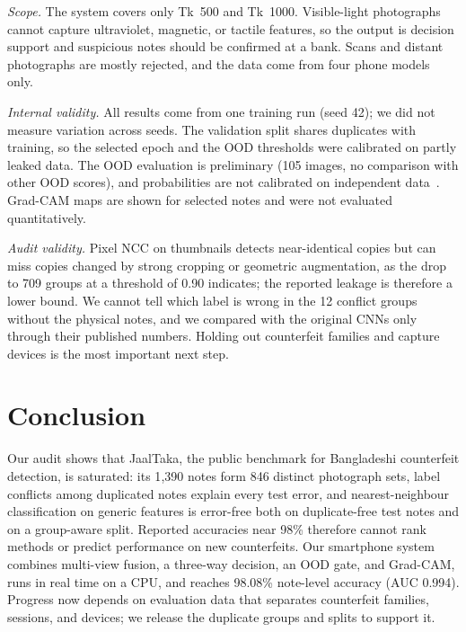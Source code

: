 \documentclass[pdflatex,iicol,sn-mathphys-num]{sn-jnl}
\begin{document}
\emph{Scope.} The system covers only Tk~500 and Tk~1000. Visible-light photographs
cannot capture ultraviolet, magnetic, or tactile features, so the output is decision
support and suspicious notes should be confirmed at a bank. Scans and distant
photographs are mostly rejected, and the data come from four phone models only.

\emph{Internal validity.} All results come from one training run (seed 42); we did not
measure variation across seeds. The validation split shares duplicates with training,
so the selected epoch and the OOD thresholds were calibrated on partly leaked data. The
OOD evaluation is preliminary (105 images, no comparison with other OOD scores), and
probabilities are not calibrated on independent data~\cite{guo2017calibration}.
Grad-CAM maps are shown for selected notes and were not evaluated quantitatively.

\emph{Audit validity.} Pixel NCC on thumbnails detects near-identical copies but can
miss copies changed by strong cropping or geometric augmentation, as the drop to 709
groups at a threshold of 0.90 indicates; the reported leakage is therefore a lower bound.
We cannot tell which label is wrong in the 12 conflict groups without the physical
notes, and we compared with the original CNNs only through their published numbers.
Holding out counterfeit families and capture devices is the most important next step.

\section{Conclusion}\label{sec:conclusion}

Our audit shows that JaalTaka, the public benchmark for Bangladeshi counterfeit
detection, is saturated: its 1{,}390 notes form 846 distinct photograph sets, label
conflicts among duplicated notes explain every test error, and nearest-neighbour
classification on generic features is error-free both on duplicate-free test notes and
on a group-aware split. Reported accuracies near 98\% therefore cannot rank methods or
predict performance on new counterfeits. Our smartphone system combines multi-view
fusion, a three-way decision, an OOD gate, and Grad-CAM, runs in real time on a CPU, and
reaches 98.08\% note-level accuracy (AUC 0.994). Progress now depends on evaluation data
that separates counterfeit families, sessions, and devices; we release the duplicate
groups and splits to support it.
\end{document}
